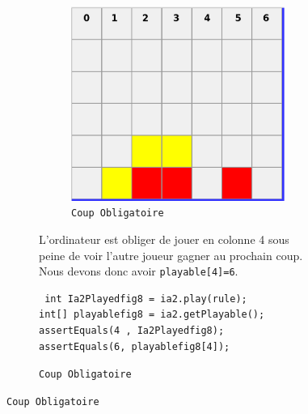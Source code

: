 \begin{figure}[H]
\begin{figure}[H]
\begin{figure}[H]
\begin{center}
  \includegraphics[scale=0.2]{playable6}
  \caption{\texttt{Coup Obligatoire}}
\end{center}
\end{figure}
L'ordinateur est obliger de jouer en colonne 4 sous peine de voir l'autre joueur gagner au prochain coup.
Nous devons donc avoir \texttt{playable[4]=6}.

\begin{verbatim}
 int Ia2Playedfig8 = ia2.play(rule);
int[] playablefig8 = ia2.getPlayable();
assertEquals(4 , Ia2Playedfig8);
assertEquals(6, playablefig8[4]);
\end{verbatim}



\end{figure}
\end{figure}
